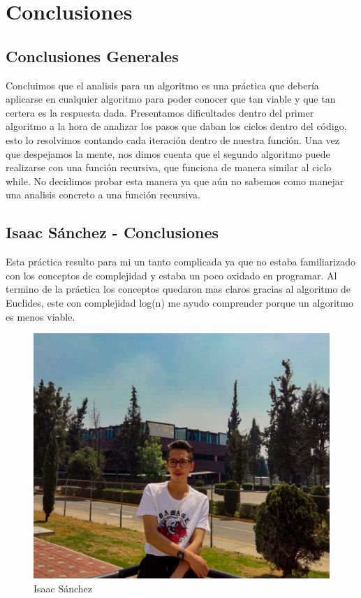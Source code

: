 \chapter{Conclusiones}

\section{Conclusiones Generales}
    Concluimos que el analisis para un algoritmo es una práctica que debería aplicarse en cualquier algoritmo para poder conocer que tan viable y que tan certera es la respuesta dada. 
    Presentamos dificultades dentro del primer algoritmo a la hora de analizar los pasos que daban los ciclos dentro del código, esto lo resolvimos contando cada iteración dentro de nuestra función.
    Una vez que despejamos la mente, nos dimos cuenta que el segundo algoritmo puede realizarse con una función recursiva, que funciona de manera similar al ciclo while. No decidimos probar esta manera ya que aún no sabemos como manejar una analisis concreto a una función recursiva. 

\newpage
\section{Isaac Sánchez - Conclusiones}
    Esta práctica resulto para mi un tanto complicada ya que no estaba familiarizado con los conceptos de complejidad y estaba un poco oxidado en programar. Al termino de la práctica los conceptos quedaron mas claros gracias al algoritmo de Euclides, este con complejidad log(n) me ayudo comprender porque un algoritmo es menos viable.
    \begin{figure}[htp!]
            \centering
            \includegraphics[width=1 \textwidth]{Images/Fotos_Alumnos/274612600_2528992867236334_6677874837890685705_n.jpg}  
            \caption{Isaac Sánchez}
            \label{fig:my_label}
        \end{figure}
    


